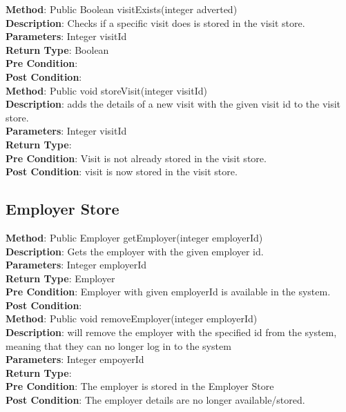 \documentclass{l3deliverable}
\begin{document}
\textbf{Method}: Public Boolean visitExists(integer adverted)\\
\textbf{Description}: Checks if a specific visit does is stored in the visit store. \\
\textbf{Parameters}: Integer visitId\\
\textbf{Return Type}: Boolean\\
\textbf{Pre Condition}:\\
\textbf{Post Condition}:\\

\textbf{Method}: Public void storeVisit(integer visitId) \\
\textbf{Description}:  adds the details of a new visit with the given visit id to the visit store.\\
\textbf{Parameters}: Integer visitId\\
\textbf{Return Type}:\\
\textbf{Pre Condition}: Visit is not already stored in the visit store.\\
\textbf{Post Condition}: visit is now stored in the visit store.\\

\subsection{Employer Store}

\textbf{Method}: Public Employer getEmployer(integer employerId)\\
\textbf{Description}: Gets the employer with the given employer id.\\
\textbf{Parameters}:  Integer employerId\\
\textbf{Return Type}: Employer\\
\textbf{Pre Condition}: Employer with given employerId is available in the system.\\
\textbf{Post Condition}:\\

\textbf{Method}: Public void removeEmployer(integer employerId) \\
\textbf{Description}: will remove the employer with the specified id from the system, meaning that they can no longer log in to the system\\
\textbf{Parameters}: Integer empoyerId\\
\textbf{Return Type}:\\
\textbf{Pre Condition}: The employer is stored in the Employer Store\\
\textbf{Post Condition}: The employer details are no longer available/stored.\\
\end{document}
